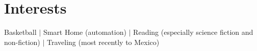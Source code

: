 \section{\textbf{Interests}}
\begin{itemize}[leftmargin=0.1in, label={}]
   \small{\item{
    Basketball $|$ Smart Home (automation) $|$ Reading (especially science fiction and non-fiction) $|$ Traveling (most recently to Mexico)
   }}
\end{itemize}
\vspace{-16pt} 